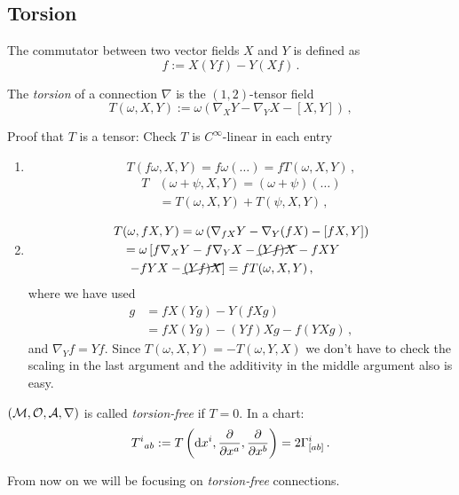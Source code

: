 \documentclass[11pt, a4paper, twocolumn]{article} %
\begin{document}
\subsection{Torsion}
\begin{defn}[Commutator]
    The commutator between two vector fields $X$ and $Y$ is defined as
    \begin{equation}
        [X,Y]f := X(Y f) - Y(Xf)\,.
    \end{equation}
\end{defn}
\begin{defn}[Torsion]
    The \textit{torsion} of a connection $\nabla$ is the $(1,2)$-tensor field
    \begin{equation}
    T(\omega, X, Y) := \omega \left( \nabla_X Y - \nabla_Y X - [X,Y] \right)\,,
    \end{equation}
\end{defn}
Proof that $T$ is a tensor: Check $T$ is $C^\infty$-linear in each entry
\begin{enumerate}
    \item 
        \begin{equation}
            T(f\omega, X, Y) = f \omega (\ldots) = f T(\omega, X,Y)\,,
        \end{equation}
        \begin{align}
            T&(\omega + \psi, X, Y) = (\omega + \psi) (\ldots)\\
            \nonumber &= T(\omega, X,Y) + T(\psi, X, Y)\,,
        \end{align}
    \item
        \begin{align}
            \nonumber T&(\omega, fX, Y) = \omega \left( \nabla_{fX} Y - \nabla_Y (fX) - [fX, Y] \right)\\
            \nonumber &= \omega \left[ f\nabla_X Y - f \nabla_Y X - \cancel{(Yf)X} - fXY \right.\\
            &~\left.- fYX - \cancel{(Yf)X} \right] = f T(\omega, X, Y)\,,
        \end{align}
        where we have used
        \begin{align}
            [fX,Y]g &= fX(Yg) - Y(fXg) \\
            \nonumber &= fX(Yg) - (Yf)Xg - f(YXg)\,,
        \end{align}
        and $\nabla_Y f = Yf$.
        Since $T(\omega,X,Y) = -T(\omega, Y, X)$ we don't have to check the scaling
        in the last argument and the additivity in the middle argument also is easy.
\end{enumerate}
\begin{defn}
    $(\mathcal{M}, \mathcal{O}, \mathcal{A}, \nabla)$ is called \textit{torsion-free} if $T=0$.
    In a chart:
    \begin{equation}
        T^i{}_{ab} := T\left(\operatorname{d\!} x^i, \frac{\partial}{\partial x^a}, \frac{\partial}{\partial x^b}\right) = 
        2\Gamma^i_{[ab]}\,.
    \end{equation}
\end{defn}
From now on we will be focusing on \textit{torsion-free} connections.
\end{document}
